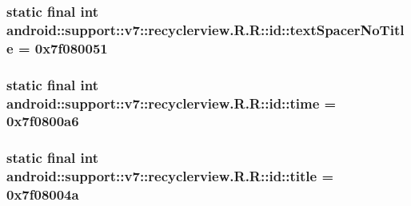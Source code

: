 \hypertarget{classandroid_1_1support_1_1v7_1_1recyclerview_1_1_r_1_1id_144c98d6773df7455ae0f612248e4f37}{
\subsubsection[{textSpacerNoTitle}]{\setlength{\rightskip}{0pt plus 5cm}static final int android::support::v7::recyclerview.R.R::id::textSpacerNoTitle = 0x7f080051}}
\label{classandroid_1_1support_1_1v7_1_1recyclerview_1_1_r_1_1id_144c98d6773df7455ae0f612248e4f37}


\hypertarget{classandroid_1_1support_1_1v7_1_1recyclerview_1_1_r_1_1id_5d9b2fa699075c0487987ad174b5e1de}{
\subsubsection[{time}]{\setlength{\rightskip}{0pt plus 5cm}static final int android::support::v7::recyclerview.R.R::id::time = 0x7f0800a6}}
\label{classandroid_1_1support_1_1v7_1_1recyclerview_1_1_r_1_1id_5d9b2fa699075c0487987ad174b5e1de}


\hypertarget{classandroid_1_1support_1_1v7_1_1recyclerview_1_1_r_1_1id_f639388699fc3035f92c846d488290fb}{
\subsubsection[{title}]{\setlength{\rightskip}{0pt plus 5cm}static final int android::support::v7::recyclerview.R.R::id::title = 0x7f08004a}}
\label{classandroid_1_1support_1_1v7_1_1recyclerview_1_1_r_1_1id_f639388699fc3035f92c846d488290fb}


